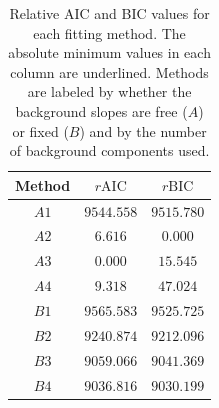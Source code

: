 \begin{table}
  \begin{center}
    \begin{tabular}{ccc}\toprule
      Method & $r\text{AIC}$ & $r\text{BIC}$\\\midrule
      $A1$ & $9544.558$ & $9515.780$\\
      $A2$ & $6.616$ & \underline{$0.000$}\\
      $A3$ & \underline{$0.000$} & $15.545$\\
       $A4$ & $9.318$ & $47.024$\\\midrule
      $B1$ & $9565.583$ & $9525.725$\\
       $B2$ & $9240.874$ & $9212.096$\\
       $B3$ & $9059.066$ & $9041.369$\\
       $B4$ & $9036.816$ & $9030.199$\\\bottomrule
    \end{tabular}
    \caption{Relative AIC and BIC values for each fitting method. The absolute minimum values in each column are underlined. Methods are labeled by whether the background slopes are free ($A$) or fixed ($B$) and by the number of background components used.}\label{tab:splot-model-results}
  \end{center}
\end{table}

